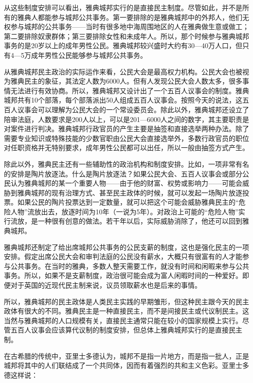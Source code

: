 从这些制度安排可以看出，雅典城邦实行的是直接民主制度。尽管如此，并不是所有的雅典人都能参与城邦公共事务。第一要排除的是雅典城邦中的外邦人，他们无权参与城邦的公共事务——当时有很多地中海周围地区的人在雅典做生意或做工；第二要排除奴隶群体；第三要排除女性和未成年人。所以，那个时候参与雅典城邦事务的是20岁以上的成年男性公民。雅典城邦较兴盛时大约有30—40万人口，但只有4—5万成年男性公民能够参与城邦公共事务。

从雅典城邦民主政治的实际运作来看，公民大会是最高权力机构。公民大会也被视为雅典民主的象征，其法定人数为6000人。但有人发现公民大会人数太多，很多事情无法进行有效协商。所以，雅典城邦又设计出了一个五百人议事会的制度。雅典城邦共有10个部落，每个部落派出50人组成五百人议事会。按照今天的说法，这五百人议事会可以理解为公民大会的一个常设委员会。除此以外，雅典城邦还设立了陪审法庭，人数要求是200人以上，可以是201—6000人之间的数字，其主要职责是对案件进行判决。雅典城邦行政官员的产生主要是抽签和直接选举两种办法。除了需要专业知识或特殊技能的少数官职由公民大会直接选举外，多数行政官员的职位对任职资格并无特别要求，成年男性公民都可以出任，所以一般由抽签方式产生。

除此以外，雅典民主还有一些辅助性的政治机构和制度安排。比如，一项非常有名的安排是陶片放逐法。什么是陶片放逐法？如果公民大会、五百人议事会或部分公民认为雅典城邦的某一个重要人物——由于他的财富、权势或影响力——可能会威胁到雅典城邦的现有治理方式、甚至民主政体的时候，就可以发起一场陶片放逐投票。如果公民的陶片投票达到一定数量，就可以把这个可能会威胁雅典民主的“危险人物”流放出去，放逐时间为10年（一说为5年）。对政治上可能的“危险人物”实行流放，是一种很有创意的做法。若干年以后，实际威胁消除了，他还可以回到雅典城邦。

雅典城邦还制定了给出席城邦公共事务的公民支薪的制度，这也是强化民主的一项安排。假定出席公民大会和审判法庭的公民没有薪水，大概只有很富有的人才能参与公共事务。在当时的雅典，多数人整天需要工作，就没有时间和闲暇来参与公共事务。所以，如果不是支薪制度，政治很可能会成为富人闲暇时间的一种爱好。即便对于英国的近现代民主制来说，议员领取薪水也是后来的事情。

所以，雅典城邦的民主政体是人类民主实践的早期雏形，但这种民主跟今天的民主政体有很大的不同。雅典民主是一种直接民主，而不是间接民主或代议制民主。这当然与雅典城邦的人口规模有关，直接民主通常只能在较小的国家规模上实行。尽管五百人议事会应该算代议制的制度安排，但总体上雅典城邦实行的是直接民主制。

在古希腊的传统中，亚里士多德认为，城邦不是指一片地方，而是指一批人，正是城邦将其中的人们联结成了一个共同体，因而有着强烈的共和主义色彩。亚里士多德这样说：


